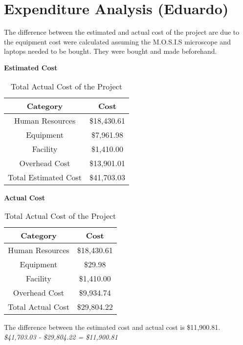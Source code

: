 \section{Expenditure Analysis (Eduardo)}
The difference between the estimated and actual cost of the project are due to the equipment cost were calculated assuming the M.O.S.I.S microscope and laptops needed to be bought. They were bought and made beforehand. \\
\begin{table}[h]
    \centering
    \textbf{Estimated Cost}\\
    \begin{tabular}{||c | c||} 
     \hline
     \rowcolor{cyan!50}
     Category & Cost \\ [0.5ex] 
     \hline
     Human Resources & \$18,430.61\\ 
     \hline
     Equipment & \$7,961.98\\
     \hline
     Facility & \$1,410.00\\
     \hline
     Overhead Cost & \$13,901.01\\
     \hline
     \rowcolor{teal!50}
     Total Estimated Cost & \$41,703.03\\
     \hline
    \end{tabular}
    \caption {Total Estimated Cost of the Project}
    \label {table:1}
\textbf{Actual Cost}\\
    \begin{tabular}{||c | c||} 
     \hline
     \rowcolor{cyan!50}
     Category & Cost \\ [0.5ex] 
     \hline
     Human Resources & \$18,430.61\\ 
     \hline
     Equipment & \$29.98 \\
     \hline
     Facility & \$1,410.00\\
     \hline
     Overhead Cost & \$9,934.74\\
     \hline
     \rowcolor{teal!50}
     Total Actual Cost & \$29,804.22\\
     \hline
    \end{tabular}
    \caption {Total Actual Cost of the Project}
    \label {table:2}
\end{table}
The difference between the estimated cost and actual cost is \$11,900.81.
\textit{\$41,703.03 - \$29,804.22 = \$11,900.81}\\